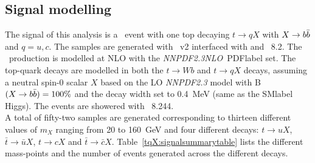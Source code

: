

\subsection{Signal modelling}

The signal of this analysis is a \ttbar\ event with one top decaying $t\to qX$ with $X\to b\bar{b}$ and $q=u,c$. The samples are generated with \POWHEGBOX~v2 interfaced with \MADSPIN and \PYTHIA~8.2. The \ttbar\ production is modelled at NLO with the \textit{NNPDF2.3NLO}~\acrshort{PDFlabel} set. The top-quark decays are modelled in \MADSPIN both the $t\to Wb$ and $t\to qX$ decays, assuming a neutral spin-0 scalar $X$ based on the LO \textit{NNPDF2.3}  model with B$(X\to b\bar{b})=100\%$ and the decay width set to 0.4~MeV (same as the \acrshort{SMlabel} Higgs). The events are showered with \PYTHIA~8.244.\\

A total of fifty-two samples are generated corresponding to thirteen different values of $m_X$ ranging from 20 to 160~GeV and four different decays: $t\to uX$, $\bar{t}\to \bar{u}X$, $t\to cX$ and $\bar{t}\to \bar{c}X$. Table~\ref{tqX:signalsummarytable} lists the different mass-points and the number of events generated across the different decays.\\

